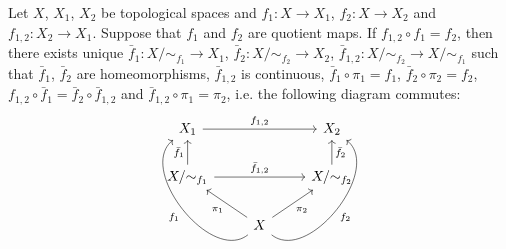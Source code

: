 \documentclass{book}
\begin{document}
	\begin{ex} 
		Let $X$, $X_1$, $X_2$ be topological spaces and $f_1:X \rightarrow X_1$, $f_2:X \rightarrow X_2$ and $f_{1,2}:X_2 \rightarrow X_1$. Suppose that $f_1$ and $f_2$ are quotient maps. If $f_{1,2} \circ f_1 = f_2$, then there exists unique $\bar{f}_1:X/{\sim_{f_1}} \rightarrow X_1$, $\bar{f}_2:X/{\sim_{f_2}} \rightarrow X_2$, $\bar{f}_{1,2}: X/{\sim_{f_2}} \rightarrow X/{\sim_{f_1}}$ such that $\bar{f}_1$, $\bar{f}_2$ are homeomorphisms, $\bar{f}_{1,2}$ is continuous, $\bar{f}_1 \circ \pi_1  = f_1$, $\bar{f}_2 \circ \pi_2  = f_2$, $f_{1,2} \circ \bar{f}_1 = \bar{f}_2 \circ \bar{f}_{1,2}$ and $\bar{f}_{1,2} \circ \pi_1 = \pi_2$, i.e. the following diagram commutes:
		\[ 
		\begin{tikzcd}
			X_1  \arrow[rr, "f_{1,2}"]   & & X_2   \\
			X/ {\sim_{f_1}} \arrow[u, "\bar{f}_1"]   \arrow[rr, "\bar{f}_{1,2}"] & &  X / {\sim_{f_2}} \arrow[u, "\bar{f}_2"']  \\
			& X   \arrow[ul, "\pi_1"] \arrow[ur, "\pi_2"'] \arrow[bend left=90]{luu}{f_1} \arrow[bend right=90, swap]{ruu}{f_2}  & 
		\end{tikzcd}
		\]
	\end{ex}
\end{document}
